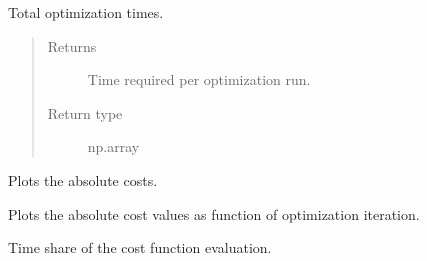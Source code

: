 \documentclass[letterpaper,10pt,english]{sphinxmanual}
\begin{document}
\begin{fulllineitems}
\begin{fulllineitems}
\end{fulllineitems}


\begin{fulllineitems}
\label{\detokenize{qsim:qsim.analyser.Analyser.opt_times}}
Total optimization times.
\begin{quote}\begin{description}
\item[{Returns}] \leavevmode
{} \textendash{} Time required per optimization run.

\item[{Return type}] \leavevmode
np.array

\end{description}\end{quote}

\end{fulllineitems}


\begin{fulllineitems}
\label{\detokenize{qsim:qsim.analyser.Analyser.plot_absolute_costs}}
Plots the absolute costs.

\end{fulllineitems}


\begin{fulllineitems}
\label{\detokenize{qsim:qsim.analyser.Analyser.plot_costs}}
Plots the absolute cost values as function of optimization
iteration.

\end{fulllineitems}


\begin{fulllineitems}
\label{\detokenize{qsim:qsim.analyser.Analyser.time_share_cost_fkt}}
Time share of the cost function evaluation.


\end{fulllineitems}
\end{fulllineitems}
\end{document}
